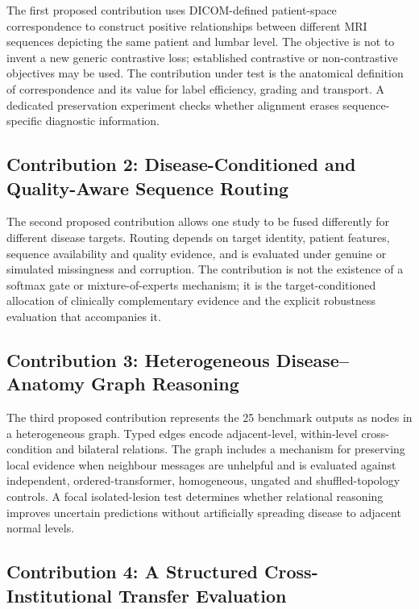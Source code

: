 The first proposed contribution uses DICOM-defined patient-space correspondence to
construct positive relationships between different MRI sequences depicting the same
patient and lumbar level. The objective is not to invent a new generic contrastive
loss; established contrastive or non-contrastive objectives may be used. The
contribution under test is the anatomical definition of correspondence and its value
for label efficiency, grading and transport. A dedicated preservation experiment
checks whether alignment erases sequence-specific diagnostic information.

\subsection{Contribution 2: Disease-Conditioned and Quality-Aware Sequence Routing}
\label{sec:intro-contrib-routing}

The second proposed contribution allows one study to be fused differently for
different disease targets. Routing depends on target identity, patient features,
sequence availability and quality evidence, and is evaluated under genuine or
simulated missingness and corruption. The contribution is not the existence of a
softmax gate or mixture-of-experts mechanism; it is the target-conditioned allocation
of clinically complementary evidence and the explicit robustness evaluation that
accompanies it.

\subsection{Contribution 3: Heterogeneous Disease--Anatomy Graph Reasoning}
\label{sec:intro-contrib-graph}

The third proposed contribution represents the 25 benchmark outputs as nodes in a
heterogeneous graph. Typed edges encode adjacent-level, within-level cross-condition
and bilateral relations. The graph includes a mechanism for preserving local
evidence when neighbour messages are unhelpful and is evaluated against independent,
ordered-transformer, homogeneous, ungated and shuffled-topology controls. A focal
isolated-lesion test determines whether relational reasoning improves uncertain
predictions without artificially spreading disease to adjacent normal levels.

\subsection{Contribution 4: A Structured Cross-Institutional Transfer Evaluation}
\label{sec:intro-contrib-transfer}

